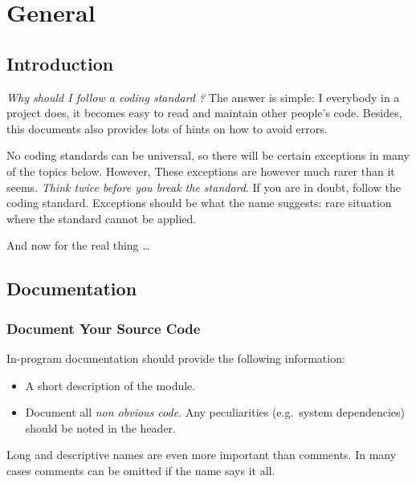 %
%

\chapter{General}
\label{c:CS:General}


\section{Introduction}
\label{s:Introduction}

\emph{Why should I follow a coding standard ?} The answer is
simple: I everybody in a project does, it becomes easy to read
and maintain other people's code.  Besides, this documents also
provides lots of hints on how to avoid errors.

No coding standards can be universal, so there will be certain
exceptions in many of the topics below.  However, These
exceptions are however much rarer than it seems.  \emph{Think
  twice before you break the standard}.  If you are in doubt,
follow the coding standard.  Exceptions should be what the name
suggests: rare situation where the standard cannot be applied.

And now for the real thing \ldots{}


%
%

\section{Documentation}


\subsection{Document Your Source Code}

In-program documentation should provide the following
information:

\begin{itemize}
  
  \item A short description of the module.
  
  \item Document all \emph{non obvious code}.  Any peculiarities
  (e.g.\ system dependencies) should be noted in the header.

\end{itemize}
  
\noindent Long and descriptive names are even more important
than comments.  In many cases comments can be omitted if the name
says it all.


